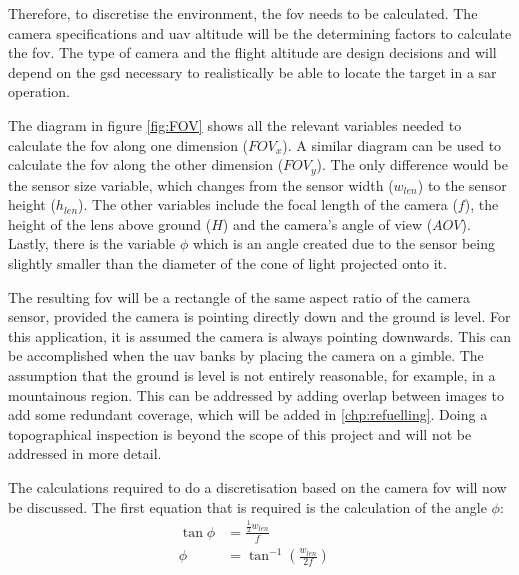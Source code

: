Therefore, to discretise the environment, the \acl{fov} needs to be calculated. The camera specifications and \acs{uav} altitude will be the determining factors to calculate the \acs{fov}. The type of camera and the flight altitude are design decisions and will depend on the \acs{gsd} necessary to realistically be able to locate the target in a \acl{sar} operation.

The diagram in figure \ref{fig:FOV} shows all the relevant variables needed to calculate the \acl{fov} along one dimension ($FOV_x$). A similar diagram can be used to calculate the \acl{fov} along the other dimension ($FOV_y$). The only difference would be the sensor size variable, which changes from the sensor width ($w_{len}$) to the sensor height ($h_{len}$). The other variables include the focal length of the camera ($f$), the height of the lens above ground ($H$) and the camera's angle of view ($AOV$). Lastly, there is the variable $\phi$ which is an angle created due to the sensor being slightly smaller than the diameter of the cone of light projected onto it.

The resulting \acl{fov} will be a rectangle of the same aspect ratio of the camera sensor, provided the camera is pointing directly down and the ground is level. For this application, it is assumed the camera is always pointing downwards. This can be accomplished when the \acs{uav} banks by placing the camera on a gimble. The assumption that the ground is level is not entirely reasonable, for example, in a mountainous region. This can be addressed by adding overlap between images to add some redundant coverage, which will be added in \ref{chp:refuelling}. Doing a topographical inspection is beyond the scope of this project and will not be addressed in more detail.

The calculations required to do a discretisation based on the camera \acl{fov} will now be discussed. The first equation that is required is the calculation of the angle $\phi$:\\
\begin{equation}
	\label{eqn:phi}
	\begin{aligned}
		\tan{\phi} &= \frac{\frac{1}{2}w_{len}}{f} &\\
		\phi &= \tan^{-1}{(\frac{w_{len}}{2f})}
	\end{aligned}	
\end{equation}

